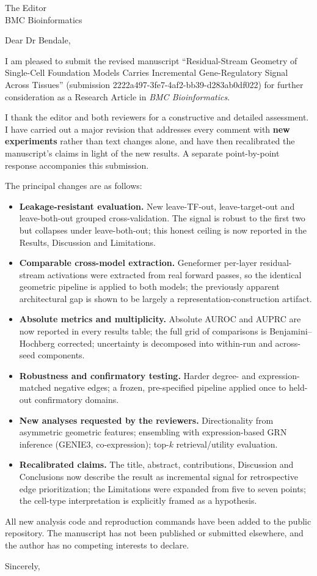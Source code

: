 \documentclass[11pt]{letter}
\begin{document}
\begin{letter}{The Editor\\BMC Bioinformatics}

\opening{Dear Dr Bendale,}

I am pleased to submit the revised manuscript ``Residual-Stream Geometry of Single-Cell Foundation Models Carries Incremental Gene-Regulatory Signal Across Tissues'' (submission 2222a497-3fe7-4af2-bb39-d283ab0df022) for further consideration as a Research Article in \textit{BMC Bioinformatics}.

I thank the editor and both reviewers for a constructive and detailed assessment. I have carried out a major revision that addresses every comment with \textbf{new experiments} rather than text changes alone, and have then recalibrated the manuscript's claims in light of the new results. A separate point-by-point response accompanies this submission.

The principal changes are as follows:

\begin{itemize}
    \item \textbf{Leakage-resistant evaluation.} New leave-TF-out, leave-target-out and leave-both-out grouped cross-validation. The signal is robust to the first two but collapses under leave-both-out; this honest ceiling is now reported in the Results, Discussion and Limitations.
    \item \textbf{Comparable cross-model extraction.} Geneformer per-layer residual-stream activations were extracted from real forward passes, so the identical geometric pipeline is applied to both models; the previously apparent architectural gap is shown to be largely a representation-construction artifact.
    \item \textbf{Absolute metrics and multiplicity.} Absolute AUROC and AUPRC are now reported in every results table; the full grid of comparisons is Benjamini--Hochberg corrected; uncertainty is decomposed into within-run and across-seed components.
    \item \textbf{Robustness and confirmatory testing.} Harder degree- and expression-matched negative edges; a frozen, pre-specified pipeline applied once to held-out confirmatory domains.
    \item \textbf{New analyses requested by the reviewers.} Directionality from asymmetric geometric features; ensembling with expression-based GRN inference (GENIE3, co-expression); top-$k$ retrieval/utility evaluation.
    \item \textbf{Recalibrated claims.} The title, abstract, contributions, Discussion and Conclusions now describe the result as incremental signal for retrospective edge prioritization; the Limitations were expanded from five to seven points; the cell-type interpretation is explicitly framed as a hypothesis.
\end{itemize}

All new analysis code and reproduction commands have been added to the public repository. The manuscript has not been published or submitted elsewhere, and the author has no competing interests to declare.

\closing{Sincerely,}

\end{letter}
\end{document}
